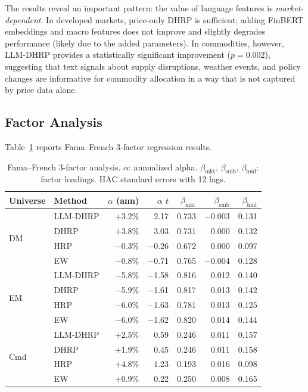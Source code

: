 \documentclass[11pt]{article}
\begin{document}
The results reveal an important pattern: the value of language features is \emph{market-dependent}. In developed markets, price-only DHRP is sufficient; adding FinBERT embeddings and macro features does not improve and slightly degrades performance (likely due to the added parameters). In commodities, however, LLM-DHRP provides a statistically significant improvement ($p = 0.002$), suggesting that text signals about supply disruptions, weather events, and policy changes are informative for commodity allocation in a way that is not captured by price data alone.

\subsection{Factor Analysis}

Table~\ref{tab:ff} reports Fama--French 3-factor regression results.

\begin{table}[t]
\centering
\caption{Fama--French 3-factor analysis. $\alpha$: annualized alpha. $\beta_{\text{mkt}}$, $\beta_{\text{smb}}$, $\beta_{\text{hml}}$: factor loadings. HAC standard errors with 12 lags.}
\label{tab:ff}
\small
\begin{tabular}{llrrrrr}
\toprule
Universe & Method & $\alpha$ (ann) & $\alpha$ $t$ & $\beta_{\text{mkt}}$ & $\beta_{\text{smb}}$ & $\beta_{\text{hml}}$ \\
\midrule
\multirow{4}{*}{DM} & LLM-DHRP & $+$3.2\% & 2.17 & 0.733 & $-$0.003 & 0.131 \\
& DHRP & $+$3.8\% & 3.03 & 0.731 & 0.000 & 0.132 \\
& HRP & $-$0.3\% & $-$0.26 & 0.672 & 0.000 & 0.097 \\
& EW & $-$0.8\% & $-$0.71 & 0.765 & $-$0.004 & 0.128 \\
\midrule
\multirow{4}{*}{EM} & LLM-DHRP & $-$5.8\% & $-$1.58 & 0.816 & 0.012 & 0.140 \\
& DHRP & $-$5.9\% & $-$1.61 & 0.817 & 0.013 & 0.142 \\
& HRP & $-$6.0\% & $-$1.63 & 0.781 & 0.013 & 0.125 \\
& EW & $-$6.0\% & $-$1.62 & 0.820 & 0.014 & 0.144 \\
\midrule
\multirow{4}{*}{Cmd} & LLM-DHRP & $+$2.5\% & 0.59 & 0.246 & 0.011 & 0.157 \\
& DHRP & $+$1.9\% & 0.45 & 0.246 & 0.011 & 0.158 \\
& HRP & $+$4.8\% & 1.23 & 0.193 & 0.016 & 0.098 \\
& EW & $+$0.9\% & 0.22 & 0.250 & 0.008 & 0.165 \\
\bottomrule
\end{tabular}
\end{table}
\end{document}
